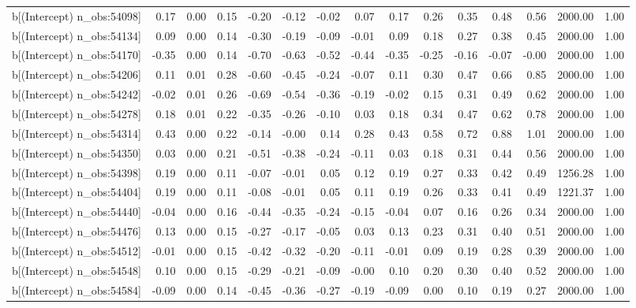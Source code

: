 \begin{table}[ht]
\begin{tabular}{rrrrrrrrrrrrrrr}
  b[(Intercept) n\_obs:54098] & 0.17 & 0.00 & 0.15 & -0.20 & -0.12 & -0.02 & 0.07 & 0.17 & 0.26 & 0.35 & 0.48 & 0.56 & 2000.00 & 1.00 \\ 
  b[(Intercept) n\_obs:54134] & 0.09 & 0.00 & 0.14 & -0.30 & -0.19 & -0.09 & -0.01 & 0.09 & 0.18 & 0.27 & 0.38 & 0.45 & 2000.00 & 1.00 \\ 
  b[(Intercept) n\_obs:54170] & -0.35 & 0.00 & 0.14 & -0.70 & -0.63 & -0.52 & -0.44 & -0.35 & -0.25 & -0.16 & -0.07 & -0.00 & 2000.00 & 1.00 \\ 
  b[(Intercept) n\_obs:54206] & 0.11 & 0.01 & 0.28 & -0.60 & -0.45 & -0.24 & -0.07 & 0.11 & 0.30 & 0.47 & 0.66 & 0.85 & 2000.00 & 1.00 \\ 
  b[(Intercept) n\_obs:54242] & -0.02 & 0.01 & 0.26 & -0.69 & -0.54 & -0.36 & -0.19 & -0.02 & 0.15 & 0.31 & 0.49 & 0.62 & 2000.00 & 1.00 \\ 
  b[(Intercept) n\_obs:54278] & 0.18 & 0.01 & 0.22 & -0.35 & -0.26 & -0.10 & 0.03 & 0.18 & 0.34 & 0.47 & 0.62 & 0.78 & 2000.00 & 1.00 \\ 
  b[(Intercept) n\_obs:54314] & 0.43 & 0.00 & 0.22 & -0.14 & -0.00 & 0.14 & 0.28 & 0.43 & 0.58 & 0.72 & 0.88 & 1.01 & 2000.00 & 1.00 \\ 
  b[(Intercept) n\_obs:54350] & 0.03 & 0.00 & 0.21 & -0.51 & -0.38 & -0.24 & -0.11 & 0.03 & 0.18 & 0.31 & 0.44 & 0.56 & 2000.00 & 1.00 \\ 
  b[(Intercept) n\_obs:54398] & 0.19 & 0.00 & 0.11 & -0.07 & -0.01 & 0.05 & 0.12 & 0.19 & 0.27 & 0.33 & 0.42 & 0.49 & 1256.28 & 1.00 \\ 
  b[(Intercept) n\_obs:54404] & 0.19 & 0.00 & 0.11 & -0.08 & -0.01 & 0.05 & 0.11 & 0.19 & 0.26 & 0.33 & 0.41 & 0.49 & 1221.37 & 1.00 \\ 
  b[(Intercept) n\_obs:54440] & -0.04 & 0.00 & 0.16 & -0.44 & -0.35 & -0.24 & -0.15 & -0.04 & 0.07 & 0.16 & 0.26 & 0.34 & 2000.00 & 1.00 \\ 
  b[(Intercept) n\_obs:54476] & 0.13 & 0.00 & 0.15 & -0.27 & -0.17 & -0.05 & 0.03 & 0.13 & 0.23 & 0.31 & 0.40 & 0.51 & 2000.00 & 1.00 \\ 
  b[(Intercept) n\_obs:54512] & -0.01 & 0.00 & 0.15 & -0.42 & -0.32 & -0.20 & -0.11 & -0.01 & 0.09 & 0.19 & 0.28 & 0.39 & 2000.00 & 1.00 \\ 
  b[(Intercept) n\_obs:54548] & 0.10 & 0.00 & 0.15 & -0.29 & -0.21 & -0.09 & -0.00 & 0.10 & 0.20 & 0.30 & 0.40 & 0.52 & 2000.00 & 1.00 \\ 
  b[(Intercept) n\_obs:54584] & -0.09 & 0.00 & 0.14 & -0.45 & -0.36 & -0.27 & -0.19 & -0.09 & 0.00 & 0.10 & 0.19 & 0.27 & 2000.00 & 1.00 \\ 

\end{tabular}
\end{table}
